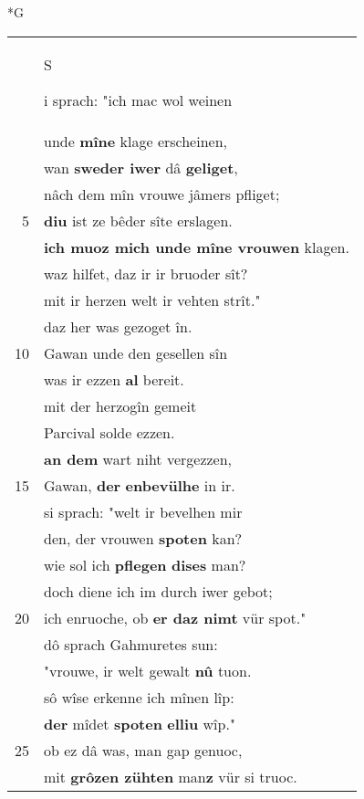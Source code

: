 \documentclass[8pt,a4paper,notitlepage]{article}
\begin{document}
\newpage
\begin{table}[ht]
\begin{minipage}[t]{0.5\linewidth}
\small
\begin{center}*G
\end{center}
\begin{tabular}{rl}
 & \begin{large}S\end{large}i sprach: "ich mac wol weinen\\ 
 & unde \textbf{mîne} klage erscheinen,\\ 
 & wan \textbf{sweder iwer} dâ \textbf{geliget},\\ 
 & nâch dem mîn vrouwe jâmers pfliget;\\ 
5 & \textbf{diu} ist ze bêder sîte erslagen.\\ 
 & \textbf{ich muoz mich unde mîne vrouwen} klagen.\\ 
 & waz hilfet, daz ir ir bruoder sît?\\ 
 & mit ir herzen welt ir vehten strît."\\ 
 & daz her was gezoget în.\\ 
10 & Gawan unde den gesellen sîn\\ 
 & was ir ezzen \textbf{al} bereit.\\ 
 & mit der herzogîn gemeit\\ 
 & Parcival solde ezzen.\\ 
 & \textbf{an dem} wart niht vergezzen,\\ 
15 & Gawan, \textbf{der} \textbf{en}\textbf{bevülhe} in ir.\\ 
 & si sprach: "welt ir bevelhen mir\\ 
 & den, der vrouwen \textbf{spoten} kan?\\ 
 & wie sol ich \textbf{pflegen} \textbf{dises} man?\\ 
 & doch diene ich im durch iwer gebot;\\ 
20 & ich enruoche, ob \textbf{er daz nimt} vür spot."\\ 
 & dô sprach Gahmuretes sun:\\ 
 & "vrouwe, ir welt gewalt \textbf{nû} tuon.\\ 
 & sô wîse erkenne ich mînen lîp:\\ 
 & \textbf{der} mîdet \textbf{spoten} \textbf{elliu} wîp."\\ 
25 & ob ez dâ was, man gap genuoc,\\ 
 & mit \textbf{grôzen zühten} man\textbf{z} vür si truoc.\\ 

\end{tabular}
\end{minipage}
\end{table}
\end{document}
